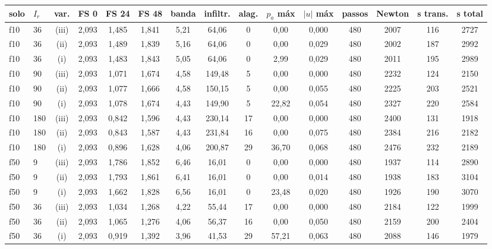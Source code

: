 \begin{tabular}{llc ccc c cc c c cc cc}
\toprule
solo & $I_r$ & var. & FS 0 & FS 24 & FS 48 & banda & infiltr. & alag. & $p_a$ máx & $|u|$ máx & passos & Newton & s trans. & s total\\
\midrule
f10 & 36 & (iii) & 2{,}093 & 1{,}485 & 1{,}841 & 5{,}21 & 64{,}06 & 0 & 0{,}00 & 0{,}000 & 480 & 2007 & 116 & 2727\\
f10 & 36 & (ii) & 2{,}093 & 1{,}489 & 1{,}839 & 5{,}16 & 64{,}06 & 0 & 0{,}00 & 0{,}029 & 480 & 2002 & 187 & 2992\\
f10 & 36 & (i) & 2{,}093 & 1{,}483 & 1{,}843 & 5{,}05 & 64{,}06 & 0 & 2{,}99 & 0{,}029 & 480 & 2011 & 195 & 2989\\
\midrule
f10 & 90 & (iii) & 2{,}093 & 1{,}071 & 1{,}674 & 4{,}58 & 149{,}48 & 5 & 0{,}00 & 0{,}000 & 480 & 2232 & 124 & 2150\\
f10 & 90 & (ii) & 2{,}093 & 1{,}077 & 1{,}666 & 4{,}58 & 150{,}15 & 5 & 0{,}00 & 0{,}055 & 480 & 2225 & 203 & 2521\\
f10 & 90 & (i) & 2{,}093 & 1{,}078 & 1{,}674 & 4{,}43 & 149{,}90 & 5 & 22{,}82 & 0{,}054 & 480 & 2327 & 220 & 2584\\
\midrule
f10 & 180 & (iii) & 2{,}093 & 0{,}842 & 1{,}596 & 4{,}43 & 230{,}14 & 17 & 0{,}00 & 0{,}000 & 480 & 2400 & 131 & 1918\\
f10 & 180 & (ii) & 2{,}093 & 0{,}843 & 1{,}587 & 4{,}43 & 231{,}84 & 16 & 0{,}00 & 0{,}075 & 480 & 2384 & 216 & 2182\\
f10 & 180 & (i) & 2{,}093 & 0{,}896 & 1{,}628 & 4{,}06 & 200{,}87 & 29 & 36{,}70 & 0{,}068 & 480 & 2476 & 232 & 2189\\
\midrule
f50 & 9 & (iii) & 2{,}093 & 1{,}786 & 1{,}852 & 6{,}46 & 16{,}01 & 0 & 0{,}00 & 0{,}000 & 480 & 1937 & 114 & 2890\\
f50 & 9 & (ii) & 2{,}093 & 1{,}793 & 1{,}861 & 6{,}41 & 16{,}01 & 0 & 0{,}00 & 0{,}014 & 480 & 1938 & 183 & 3104\\
f50 & 9 & (i) & 2{,}093 & 1{,}662 & 1{,}828 & 6{,}56 & 16{,}01 & 0 & 23{,}48 & 0{,}020 & 480 & 1926 & 190 & 3070\\
\midrule
f50 & 36 & (iii) & 2{,}093 & 1{,}034 & 1{,}268 & 4{,}22 & 55{,}44 & 17 & 0{,}00 & 0{,}000 & 480 & 2184 & 122 & 1999\\
f50 & 36 & (ii) & 2{,}093 & 1{,}065 & 1{,}276 & 4{,}06 & 56{,}37 & 16 & 0{,}00 & 0{,}050 & 480 & 2159 & 200 & 2404\\
f50 & 36 & (i) & 2{,}093 & 0{,}919 & 1{,}392 & 3{,}96 & 41{,}53 & 29 & 57{,}21 & 0{,}063 & 480 & 2088 & 146 & 1979\\

\end{tabular}
